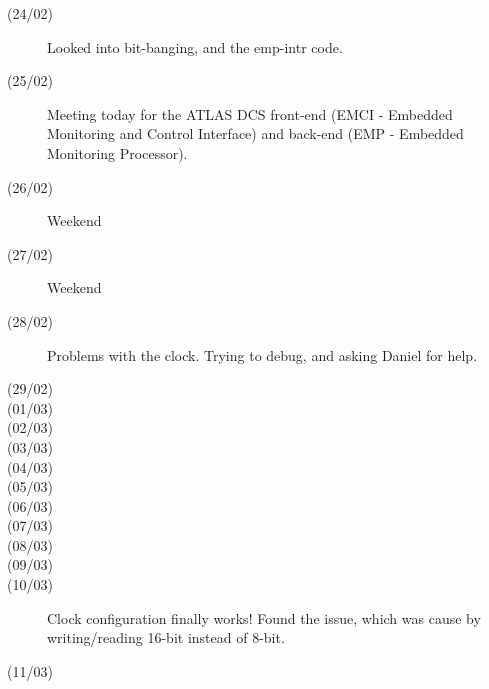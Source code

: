 \begin{description}
\item[(24/02)] Looked into bit-banging, and the emp-intr code. 
\item[(25/02)] Meeting today for the ATLAS DCS front-end (EMCI - Embedded Monitoring and Control Interface) and back-end (EMP - Embedded Monitoring Processor).
\item[(26/02)] Weekend
\item[(27/02)] Weekend
\item[(28/02)] Problems with the clock. Trying to debug, and asking Daniel for help.
\item[(29/02)] 
\item[(01/03)] 
\item[(02/03)] 
\item[(03/03)] 
\item[(04/03)] 
\item[(05/03)] 
\item[(06/03)] 
\item[(07/03)] 
\item[(08/03)] 
\item[(09/03)] 
\item[(10/03)] Clock configuration finally works! Found the issue, which was cause by writing/reading 16-bit instead of 8-bit.
\item[(11/03)] 

\end{description}